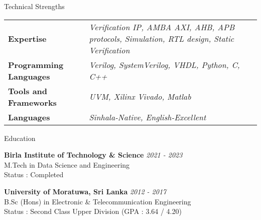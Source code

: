 \documentclass[
11pt, %
]{./assets/resume} %
\begin{document}
\begin{rSection}{Technical Strengths}
	
	\def\arraystretch{1.5}
	
	\begin{tabular}{p{2.0in} p{4.5in}}
		\textbf{Expertise} & \emph{Verification IP, AMBA AXI, AHB, APB protocols, Simulation, RTL design, Static Verification} \\
		\textbf{Programming Languages} & \emph{Verilog, SystemVerilog, VHDL, Python, C, C++} \\
		\textbf{Tools and Frameworks} & \emph{UVM, Xilinx Vivado, Matlab} \\ 
		\textbf{Languages} & \emph{Sinhala-Native, English-Excellent} \\
	\end{tabular}
	
\end{rSection}


\begin{rSection}{Education}
	
	\textbf{Birla Institute of Technology \& Science} \hfill \textit{2021 - 2023} \\ 
	M.Tech in Data Science and Engineering \\
	Status : Completed

	\textbf{University of Moratuwa, Sri Lanka} \hfill \textit{2012 - 2017} \\ 
	B.Sc (Hons) in Electronic \& Telecommunication Engineering \\
	Status : Second Class Upper Division (GPA : 3.64 / 4.20)
	
\end{rSection}

\end{document}
